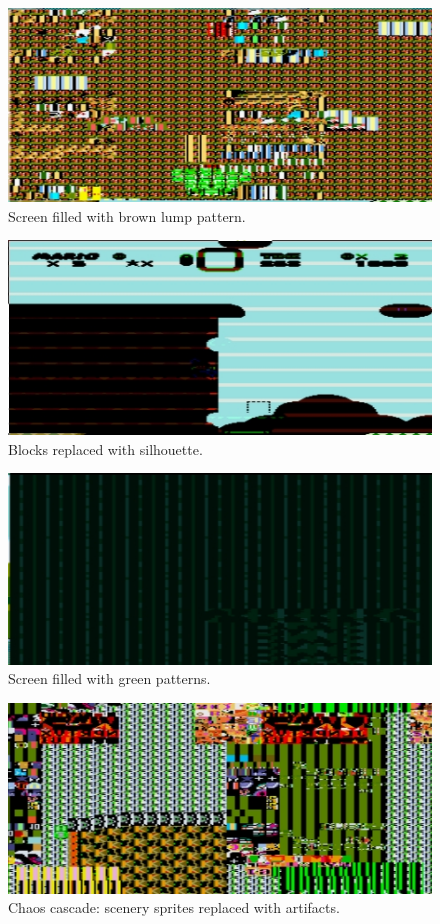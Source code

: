 \documentclass[]{article}
\begin{document}
\begin{figure}
\centering
\includegraphics{./img/Tuesday-13-28-43.jpg}
\caption{Screen filled with brown lump pattern.}
\end{figure}

\begin{figure}
\centering
\includegraphics{./img/Tuesday-13-33-50.jpg}
\caption{Blocks replaced with silhouette.}
\end{figure}

\begin{figure}
\centering
\includegraphics{./img/Tuesday-13-33-58.jpg}
\caption{Screen filled with green patterns.}
\end{figure}

\begin{figure}
\centering
\includegraphics{./img/Tuesday-13-36-07.jpg}
\caption{Chaos cascade: scenery sprites replaced with artifacts.}
\end{figure}
\end{document}
